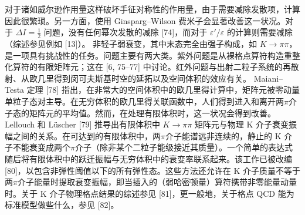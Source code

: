 对于诸如威尔逊作用量这样破坏手征对称性的作用量，由于需要减除发散项，计算因此很繁琐。另一方面，使用 Ginsparg–Wilson 费米子会显著改善这一状况。对于 $\Delta I = \tfrac{1}{2}$ 问题，没有任何幂次发散的减除 [74]，而对于 $\varepsilon'/\varepsilon$ 的计算则需要减除（综述参见例如 [13]）。
非轻子弱衰变，其中末态完全由强子构成，如 $K \to \pi\pi$，是一项具有挑战性的任务。问题主要有两大类。紫外问题是从裸格点算符构造重整化算符的有限矩阵元；这在 [6, 75--77] 中讨论。红外问题与出射二粒子系统的再散射、从欧几里得到闵可夫斯基时空的延拓以及空间体积的效应有关。
Maiani–Testa 定理 [78] 指出，在非常大的空间体积中的欧几里得计算中，矩阵元被零动量单粒子态对主导。在无穷体积的欧几里得关联函数中，人们得到进入和离开两$\pi$介子态的矩阵元的平均值。然而，在处理有限体积时，这一状况会得到改善。Lellouch 和 Lüscher [79] 推导出有限体积中 $K \to \pi\pi$ 矩阵元与物理 K 介子衰变振幅之间的关系。在可达到的有限体积中，两$\pi$介子能谱远非连续的，静止的 K 介子不能衰变成两个$\pi$介子（除非某个二粒子能级接近其质量）。一个简单的表达式随后将有限体积中的跃迁振幅与无穷体积中的衰变率联系起来。该工作已被改编 [80]，以包含非弹性阈值以下的所有弹性态。这些方法还允许在 K 介子质量不等于两$\pi$介子能量时提取衰变振幅，即当插入的（弱哈密顿量）算符携带非零能量动量时。关于 K 介子物理格点结果的综述参见 [81]，更一般地，关于格点 QCD 能为标准模型做些什么，参见 [82]。

